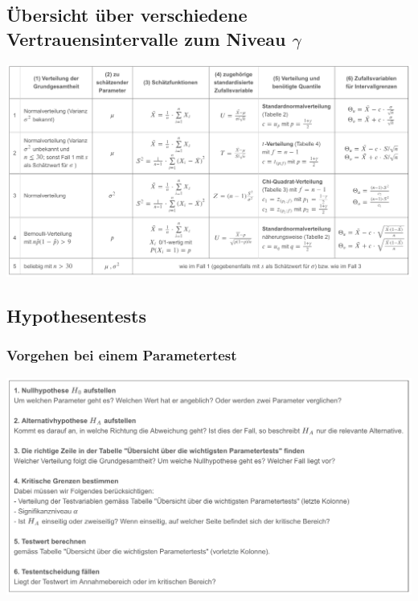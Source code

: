 \subsection{Übersicht über verschiedene Vertrauensintervalle zum Niveau $\gamma$}
\label{sec:uebersicht_ueber_verschiedene_vertrauensintervalle_zum_niveau_gamma}
\begin{center}
    \includegraphics[width=1\linewidth]{images/vertrauensintervalle}
\end{center}
\subsection{Hypothesentests}
\label{sec:hypothesentests}
\subsubsection{Vorgehen bei einem Parametertest}
\label{sec:vorgehen_bei_einem_parametertest}
\begin{center}
    \includegraphics[width=1\linewidth]{images/parametertests}
\end{center}
